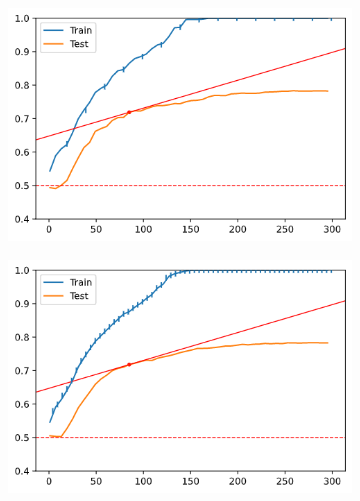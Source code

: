 \begin{figure}[H]
\begin{subfigure}[b]{0.32\linewidth}
    \end{subfigure}
    \begin{subfigure}[b]{0.32\linewidth}
        \includegraphics[width=\linewidth]{img/ch5/sampling/300-s20-p01-pre.png}
    \end{subfigure}
    \begin{subfigure}[b]{0.32\linewidth}
        \includegraphics[width=\linewidth]{img/ch5/sampling/300-s5-p01-pre.png}
    \end{subfigure}
    \begin{subfigure}[b]{0.32\linewidth}

\end{subfigure}
\end{figure}
